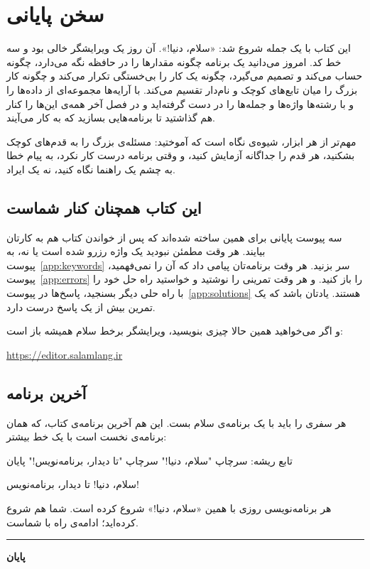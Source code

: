 \chapter*{سخن پایانی}

این کتاب با یک جمله شروع شد: «سلام، دنیا!». آن روز یک ویرایشگر خالی بود و
سه خط کد. امروز می‌دانید یک برنامه چگونه مقدارها را در حافظه نگه می‌دارد،
چگونه حساب می‌کند و تصمیم می‌گیرد، چگونه یک کار را بی‌خستگی تکرار می‌کند و
چگونه کار بزرگ را میان تابع‌های کوچک و نام‌دار تقسیم می‌کند. با آرایه‌ها
مجموعه‌ای از داده‌ها را و با رشته‌ها واژه‌ها و جمله‌ها را در دست گرفته‌اید و
در فصل آخر همه‌ی این‌ها را کنار هم گذاشتید تا برنامه‌هایی بسازید که به
کار می‌آیند.

مهم‌تر از هر ابزار، شیوه‌ی نگاه است که آموختید: مسئله‌ی بزرگ را به قدم‌های
کوچک بشکنید، هر قدم را جداگانه آزمایش کنید، و وقتی برنامه درست کار نکرد،
به پیام خطا به چشم یک راهنما نگاه کنید، نه یک ایراد.

\section*{این کتاب همچنان کنار شماست}

سه پیوست پایانی برای همین ساخته شده‌اند که پس از خواندن کتاب هم به کارتان
بیایند. هر وقت مطمئن نبودید یک واژه رزرو شده است یا نه، به پیوست~\ref{app:keywords} سر بزنید. هر وقت برنامه‌تان پیامی داد که آن را نمی‌فهمید،
پیوست~\ref{app:errors} را باز کنید. و هر وقت تمرینی را نوشتید و خواستید
راه حل خود را با راه حلی دیگر بسنجید، پاسخ‌ها در پیوست~\ref{app:solutions}
هستند. یادتان باشد که یک تمرین بیش از یک پاسخ درست دارد.

و اگر می‌خواهید همین حالا چیزی بنویسید، ویرایشگر برخط سلام همیشه باز است:
\begin{center}
\url{https://editor.salamlang.ir}
\end{center}

\section*{آخرین برنامه}

هر سفری را باید با یک برنامه‌ی سلام بست. این هم آخرین برنامه‌ی کتاب، که
همان برنامه‌ی نخست است با یک خط بیشتر:

\begin{salamfa}
تابع ریشه:
    سرچاپ "سلام، دنیا!"
    سرچاپ "تا دیدار، برنامه‌نویس!"
پایان
\end{salamfa}

\begin{outputfa}
سلام، دنیا!
تا دیدار، برنامه‌نویس!
\end{outputfa}

هر برنامه‌نویسی روزی با همین «سلام، دنیا!» شروع کرده است. شما هم شروع
کرده‌اید؛ ادامه‌ی راه با شماست.

\vspace{1.5em}
\begin{center}
{\color{brand}\rule{2.5cm}{1pt}}\par\vspace{0.6em}
{\salamcodefont\bfseries\Large\color{salamKeyword}پایان}
\end{center}
